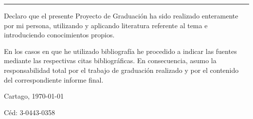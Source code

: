 \thispagestyle{empty}

\rule{10mm}{0pt}

\vfill

Declaro que el presente Proyecto de Graduación ha sido realizado enteramente
por mi persona, utilizando y aplicando literatura referente al tema e
introduciendo conocimientos propios.

En los casos en que he utilizado bibliografía he procedido a indicar las
fuentes mediante las respectivas citas bibliográficas.  En consecuencia,
asumo la responsabilidad total por el trabajo de graduación realizado y por
el contenido del correspondiente informe final.



\vspace*{8mm}

\begin{flushright}
  \scriptAuthor\pa
  Cartago, \today\par
  Céd: 3-0443-0358
\end{flushright}

\cleardoublepage

